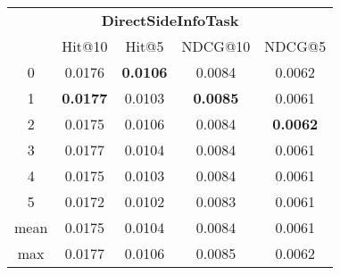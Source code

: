 \documentclass{article}
\begin{document}
 

\begin{tabular}{c|cccc}

\multicolumn{5}{c}{\textbf{DirectSideInfoTask}} \\
\noalign{\smallskip}
\noalign{\smallskip}
\toprule
\multicolumn{1}{c}{Template ID} & \multicolumn{1}{|c}{Hit@10} & \multicolumn{1}{c}{Hit@5} & \multicolumn{1}{c}{NDCG@10} & \multicolumn{1}{c}{NDCG@5} \\
\midrule
0 & 0.0176 & \textbf{0.0106} & 0.0084 & 0.0062 \\
1 & \textbf{0.0177} & 0.0103 & \textbf{0.0085} & 0.0061 \\
2 & 0.0175 & 0.0106 & 0.0084 & \textbf{0.0062} \\
3 & 0.0177 & 0.0104 & 0.0084 & 0.0061 \\
4 & 0.0175 & 0.0103 & 0.0084 & 0.0061 \\
5 & 0.0172 & 0.0102 & 0.0083 & 0.0061 \\
\midrule
mean & 0.0175 & 0.0104 & 0.0084 & 0.0061 \\
max & 0.0177 & 0.0106 & 0.0085 & 0.0062 \\
\bottomrule

\end{tabular}
\end{document}

